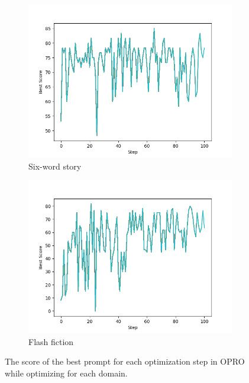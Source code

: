 \documentclass[phd,electronic,oneside,twosidetoc,letterpaper,chaptercenter,parttop,lof]{byumsphd}
\begin{document}
\begin{figure}[t!]
  \begin{subfigure}[b]{0.45\textwidth}
    \includegraphics[width=\textwidth]{images/cc_prompting/six-word_best_scores_over_time.png}
    \caption{Six-word story}
    \label{fig:six-word}
  \end{subfigure}
  \hfill
  \begin{subfigure}[b]{0.45\textwidth}
    \includegraphics[width=\textwidth]{images/cc_prompting/story_best_scores_over_time.png}
    \caption{Flash fiction}
    \label{fig:flash-fiction}
  \end{subfigure}

  \caption[OPRO optimization curves]{The score of the best prompt for each optimization step in OPRO while optimizing for each domain.} 
  \label{fig:training}
\end{figure}
\end{document}
